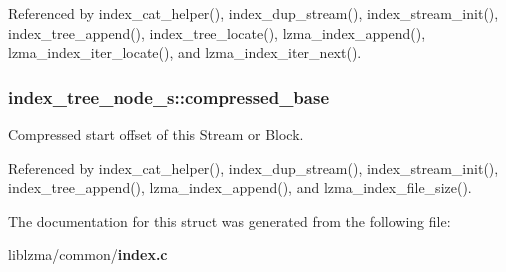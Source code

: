 Referenced by index\-\_\-cat\-\_\-helper(), index\-\_\-dup\-\_\-stream(), index\-\_\-stream\-\_\-init(), index\-\_\-tree\-\_\-append(), index\-\_\-tree\-\_\-locate(), lzma\-\_\-index\-\_\-append(), lzma\-\_\-index\-\_\-iter\-\_\-locate(), and lzma\-\_\-index\-\_\-iter\-\_\-next().

\subsubsection[{compressed\-\_\-base}]{ index\-\_\-tree\-\_\-node\-\_\-s\-::compressed\-\_\-base}\label{structindex__tree__node__s_a9d6408ee6c8682141d1ebff3ec17865d}


Compressed start offset of this Stream or Block. 



Referenced by index\-\_\-cat\-\_\-helper(), index\-\_\-dup\-\_\-stream(), index\-\_\-stream\-\_\-init(), index\-\_\-tree\-\_\-append(), lzma\-\_\-index\-\_\-append(), and lzma\-\_\-index\-\_\-file\-\_\-size().



The documentation for this struct was generated from the following file\-:\begin{DoxyCompactItemize}
\item 
liblzma/common/{\bf index.\-c}\end{DoxyCompactItemize}
